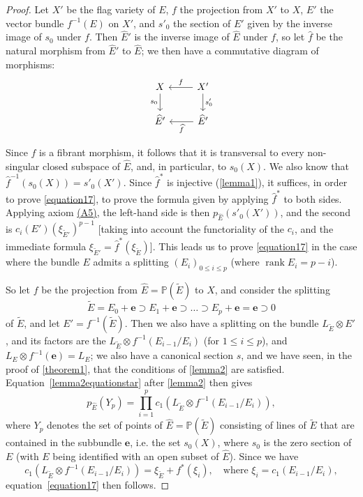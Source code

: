 \documentclass{article}
\theoremstyle{plain}
\theoremstyle{definition}
\renewcommand{\leq}{\leqslant}
\DeclareMathOperator{\rank}{rank}
\newcommand{\oldpage}[1]{\marginpar{\footnotesize$\Big\vert$ \textit{p.~#1}}}
\begin{document}
\begin{proof}
  Let $X'$ be the flag variety of $E$, $f$ the projection from $X'$ to $X$, $E'$ the vector bundle $f^{-1}(E)$ on $X'$, and $s'_0$ the section of $E'$ given by the inverse image of $s_0$ under $f$.
  Then $\widehat{E}'$ is the inverse image of $\widehat{E}$ under $f$, so let $\widehat{f}$ be the natural morphism from $\widehat{E}'$ to $\widehat{E}$;
  we then have a commutative diagram of morphisms:
  \[
    \begin{tikzcd}
      X \dar[swap,"s_0"]
      & X' \lar[swap,"f"] \dar["s'_0"]
    \\\widehat{E}'
      & \widehat{E}' \lar["\widehat{f}"]
    \end{tikzcd}
  \]

  Since $\widehat{f}$ is a fibrant morphism, it follows that it is transversal to every non-singular closed subspace of $\widehat{E}$, and, in particular, to $s_0(X)$.
  We also know that $\widehat{f}^{-1}(s_0(X)) = s'_0(X')$.
  Since $\widehat{f}^*$ is injective (\cref{lemma1}), it suffices, in order to prove \cref{equation17}, to prove the formula given by applying $\widehat{f}^*$ to both sides.
  Applying axiom \hyperref[axiomA5]{(A5)}, the left-hand side is then $p_{\widehat{E}}(s'_0(X'))$, and the second is $c_i(E')(\xi_{\widetilde{E}'})^{p-1}$ [taking into account the functoriality of the $c_i$, and the immediate formula $\xi_{\widetilde{E}'}=\widehat{f}^*(\xi_{\widetilde{E}})$].
  This leads us to prove \cref{equation17} in the case where the bundle $E$ admits a splitting $(E_i)_{0\leq i\leq p}$ (where $\rank E_i=p-i$).

  So let $f$ be the projection from $\widehat{E}=\mathbb{P}(\widetilde{E})$ to $X$, and consider the splitting
  \[
    \widetilde{E} = E_0+\mathbf{e} \supset E_1+\mathbf{e} \supset \ldots \supset E_p+\mathbf{e} = \mathbf{e} \supset 0
  \]
  of $\widetilde{E}$, and let $E'=f^{-1}(\widetilde{E})$.
  Then we also have a splitting on the bundle $L_{\widetilde{E}}\otimes E'$, and its factors are the $L_{\widetilde{E}}\otimes f^{-1}(E_{i-1}/E_i)$ (for $1\leq i\leq p$), and $L_E\otimes f^{-1}(\mathbf{e}) = L_E$;
  we also have a canonical section $s$, and we have seen, in the proof of \cref{theorem1}, that the conditions of \cref{lemma2} are satisfied.
  Equation~\cref{lemma2equationstar}
\oldpage{153}
  after \cref{lemma2} then gives
  \[
    p_{\widehat{E}}(Y_p) = \prod_{i=1}^p c_1(L_{\widetilde{E}}\otimes f^{-1}(E_{i-1}/E_i)),
  \]
  where $Y_p$ denotes the set of points of $\widehat{E}=\mathbb{P}(\widetilde{E})$ consisting of lines of $\widetilde{E}$ that are contained in the subbundle $\mathbf{e}$, i.e. the set $s_0(X)$, where $s_0$ is the zero section of $E$ (with $E$ being identified with an open subset of $\widehat{E}$).
  Since we have
  \[
    c_1(L_{\widetilde{E}}\otimes f^{-1}(E_{i-1}/E_i)) = \xi_{\widetilde{E}}+f^*(\xi_i),
    \quad\text{where }\xi_i = c_1(E_{i-1}/E_i),
  \]
  equation~\cref{equation17} then follows.
\end{proof}
\end{document}
